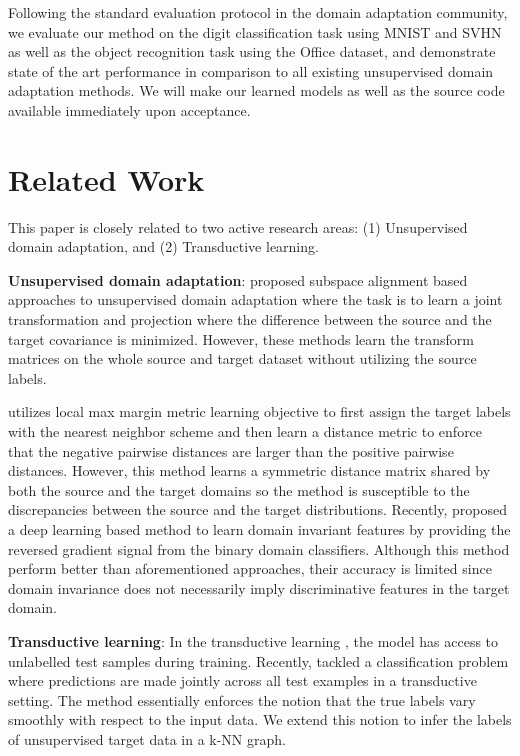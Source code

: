 \documentclass{article}
\begin{document}
Following the standard evaluation protocol in the domain adaptation community, we evaluate our method on the digit classification task using MNIST \cite{mnist} and SVHN\cite{svhn} as well as the object recognition task using the Office \cite{office} dataset, and demonstrate state of the art performance in comparison to all existing unsupervised domain adaptation methods.  We will make our learned models as well as the source code available immediately upon acceptance.

\section{Related Work} 

This paper is closely related to two active research areas: (1) Unsupervised domain adaptation, and (2) Transductive learning.

\textbf{Unsupervised domain adaptation}: \cite{gong12, baochen15, fernando13, baochen16} proposed subspace alignment based approaches to unsupervised domain adaptation where the task is to learn a joint transformation and projection where the difference between the source and the target covariance is minimized. However, these methods learn the transform matrices on the whole source and target dataset without utilizing the source labels. 

\cite{tommasi13} utilizes local max margin metric learning objective \cite{lmnn} to first assign the target labels with the nearest neighbor scheme and then learn a distance metric to enforce that the negative pairwise distances are larger than the positive pairwise distances. However, this method learns a symmetric distance matrix shared by both the source and the target domains so the method is susceptible to the discrepancies between the source and the target distributions. Recently, \cite{ganin15, tzeng14} proposed a deep learning based method to learn domain invariant features by providing the reversed gradient signal from the binary domain classifiers. Although this method perform better than aforementioned approaches, their accuracy is limited since domain invariance does not necessarily imply discriminative features in the target domain. 

\textbf{Transductive learning}: In the transductive learning \cite{transduction}, the model has access to unlabelled test samples during training. Recently, \cite{coclassification} tackled a classification problem where predictions are made jointly across all test examples in a transductive \cite{transduction} setting. The method essentially enforces the notion that the true labels vary smoothly with respect to the input data. We extend this notion to infer the labels of unsupervised target data in a k-NN graph. 
\end{document}
